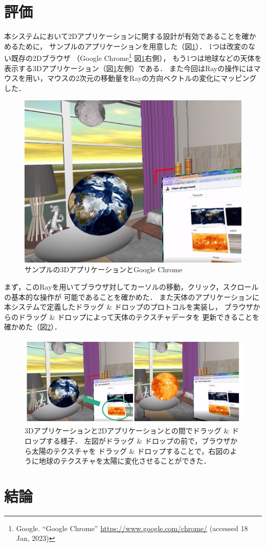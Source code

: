 \section{評価}

本システムにおいて2Dアプリケーションに関する設計が有効であることを確かめるために，
サンプルのアプリケーションを用意した（図\ref{fig:dnd-apps}）．
1つは改変のない既存の2Dブラウザ
（Google Chrome\footnote{Google. ``Google Chrome'' \url{https://www.google.com/chrome/} (accessed 18 Jan, 2023)}
図\ref{fig:dnd-apps}右側），
もう1つは地球などの天体を表示する3Dアプリケーション（図\ref{fig:dnd-apps}左側）である．
また今回はRayの操作にはマウスを用い，マウスの2次元の移動量をRayの方向ベクトルの変化にマッピングした．

\begin{figure}[htbp]
  \centering
  \includegraphics[keepaspectratio, width=0.9\linewidth]{figures/dnd-apps.png}
  \caption{
    サンプルの3DアプリケーションとGoogle Chrome
  }
  \label{fig:dnd-apps}
\end{figure}

まず，このRayを用いてブラウザ対してカーソルの移動，クリック，スクロールの基本的な操作が
可能であることを確かめた．
また天体のアプリケーションに本システムで定義したドラッグ \& ドロップのプロトコルを実装し，
ブラウザからのドラッグ \& ドロップによって天体のテクスチャデータを
更新できることを確かめた（図\ref{fig:dnd}）．

\begin{figure}[htbp]
  \centering
  \includegraphics[keepaspectratio, width=\linewidth]{figures/dnd.png}
  \caption{
    3Dアプリケーションと2Dアプリケーションとの間でドラッグ \& ドロップする様子．
    左図がドラッグ \& ドロップの前で，ブラウザから太陽のテクスチャを
    ドラッグ \& ドロップすることで，右図のように地球のテクスチャを太陽に変化させることができた．
  }
  \label{fig:dnd}
\end{figure}


\section{結論}
